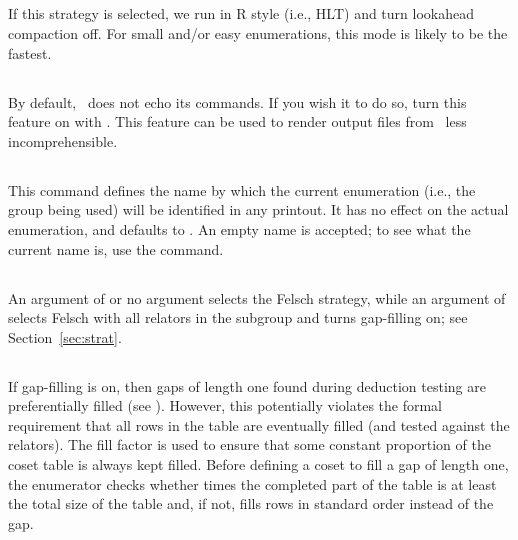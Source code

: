 \subsection{}

If this strategy is selected, we run in R style (i.e., HLT) and turn
  lookahead \amp compaction off.
For small and/or easy enumerations, this mode is likely to be the fastest.

\subsection{}

By default, \ace\ does not echo its commands.
If you wish it to do so, turn this feature on with .
This feature can be used to render output files from \ace\ less
  incomprehensible.

\subsection{}

This command defines the name by which the current enumeration (i.e.,
  the group being used) will be identified in any printout.
It has no effect on the actual enumeration, and defaults to .
An empty name is accepted; to see what the current name is, use the
   command.

\subsection{}

An argument of  or no argument selects the Felsch strategy, while
  an argument of  selects Felsch with all relators in the subgroup
  and turns gap-filling on; see Section~\ref{sec:strat}.

\subsection{}

If gap-filling is on, then gaps of length one found during deduction
  testing are preferentially filled (see \cite{Hav91}).
However, this potentially violates the formal requirement that all rows
  in the table are eventually filled (and tested against the relators).
The fill factor is used to ensure that some constant proportion of the
  coset table is always kept filled.
Before defining a coset to fill a gap of length one, the enumerator checks 
  whether  times the completed part of the table is at least the
  total size of the table and, if not, fills rows in standard order
  instead of the gap.

